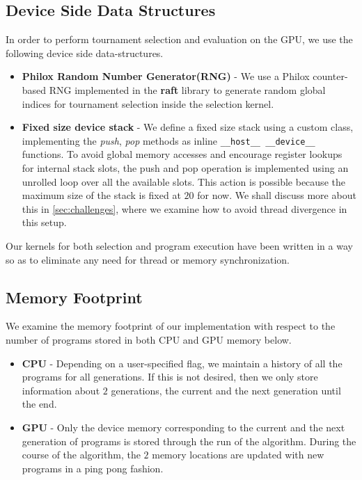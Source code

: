 \subsection{Device Side Data Structures}
\label{ow:deviceds}
In order to perform tournament selection and evaluation on the GPU, we use the following device side data-structures. 
\begin{itemize}
    \item \textbf{Philox Random Number Generator(RNG)} - We use a Philox counter-based RNG\citep{Philox2011} implemented in the {\bf raft} library \citep{raschka2020machine} to generate random global indices for tournament selection inside the selection kernel. 
    \item \textbf{Fixed size device stack} - We define a fixed size stack using a custom class, implementing the \textit{push}, \textit{pop} methods as inline \lstinline!__host__ __device__! functions. To avoid global memory accesses and encourage register lookups for internal stack slots, the push and pop operation is implemented using an unrolled loop over all the available slots. This action is possible because the maximum size of the stack is fixed at $20$ for now. We shall discuss more about this in \cref{sec:challenges}, where we examine how to avoid thread divergence in this setup.
\end{itemize}

Our kernels for both selection and program execution have been written in a way so as to eliminate any need for thread or memory synchronization. 

\subsection{Memory Footprint}
\label{ow:memory}
We examine the memory footprint of our implementation with respect to the number of programs stored in both CPU and GPU memory below. 
\begin{itemize}
    \item \textbf{CPU} - Depending on a user-specified flag, we maintain a history of all the programs for all generations. If this is not desired, then we only store information about $2$ generations, the current and the next generation until the end.
    \item \textbf{GPU} - Only the device memory corresponding to the current and the next generation of programs is stored through the run of the algorithm. During the course of the algorithm, the $2$ memory locations are updated with new programs in a ping pong fashion.
\end{itemize}


